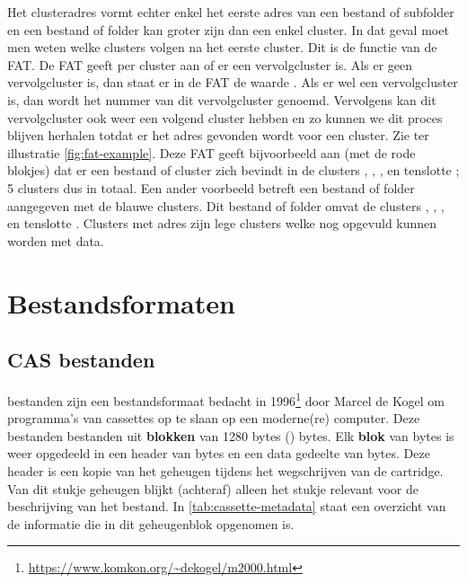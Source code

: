 Het clusteradres vormt echter enkel het eerste adres van een bestand of subfolder en een bestand of folder kan groter zijn dan een enkel cluster. In dat geval moet men weten welke clusters volgen na het eerste cluster. Dit is de functie van de FAT. De FAT geeft per cluster aan of er een vervolgcluster is. Als er geen vervolgcluster is, dan staat er in de FAT de waarde . Als er wel een vervolgcluster is, dan wordt het nummer van dit vervolgcluster genoemd. Vervolgens kan dit vervolgcluster ook weer een volgend cluster hebben en zo kunnen we dit proces blijven herhalen totdat er het adres  gevonden wordt voor een cluster. Zie ter illustratie \cref{fig:fat-example}. Deze FAT geeft bijvoorbeeld aan (met de rode blokjes) dat er een bestand of cluster zich bevindt in de clusters , , ,  en tenslotte ; 5 clusters dus in totaal. Een ander voorbeeld betreft een bestand of folder aangegeven met de blauwe clusters. Dit bestand of folder omvat de clusters , , ,  en tenslotte . Clusters met adres  zijn lege clusters welke nog opgevuld kunnen worden met data.

%
%
%
\section{Bestandsformaten}

\subsection{CAS bestanden}
\label{sec:cas-files}

\cas bestanden zijn een bestandsformaat bedacht in 1996\footnote{\url{https://www.komkon.org/~dekogel/m2000.html}} door Marcel de Kogel om programma's van  cassettes op te slaan op een moderne(re) computer. Deze bestanden bestanden uit \textbf{blokken} van 1280 bytes () bytes. Elk \textbf{blok} van  bytes is weer opgedeeld in een header van  bytes en een data gedeelte van  bytes. Deze header is een kopie van het geheugen  tijdens het wegschrijven van de cartridge. Van dit stukje geheugen blijkt (achteraf) alleen het stukje  relevant voor de beschrijving van het \cas bestand. In \cref{tab:cassette-metadata} staat een overzicht van de informatie die in dit geheugenblok opgenomen is.

